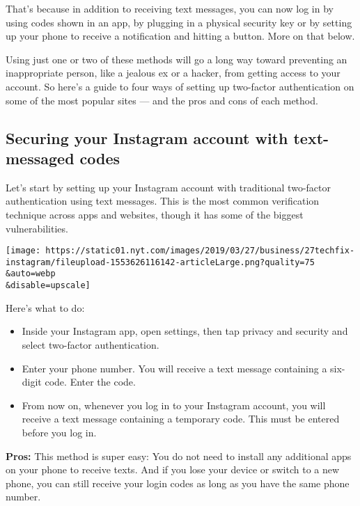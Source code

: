 That's because in addition to receiving text messages, you can now log
in by using codes shown in an app, by plugging in a physical security
key or by setting up your phone to receive a notification and hitting a
button. More on that below.

Using just one or two of these methods will go a long way toward
preventing an inappropriate person, like a jealous ex or a hacker, from
getting access to your account. So here's a guide to four ways of
setting up two-factor authentication on some of the most popular sites
--- and the pros and cons of each method.

\hypertarget{securing-your-instagram-account-with-text-messaged-codes}{%
\subsection{Securing your Instagram account with text-messaged
codes}\label{securing-your-instagram-account-with-text-messaged-codes}}

Let's start by setting up your Instagram account with traditional
two-factor authentication using text messages. This is the most common
verification technique across apps and websites, though it has some of
the biggest vulnerabilities.

\texttt{[image: https://static01.nyt.com/images/2019/03/27/business/27techfix-instagram/fileupload-1553626116142-articleLarge.png?quality=75\\\&auto=webp\\\&disable=upscale]}

Here's what to do:

\begin{itemize}
\tightlist
\item
  Inside your Instagram app, open settings, then tap privacy and
  security and select two-factor authentication.
\end{itemize}

\begin{itemize}
\item
  Enter your phone number. You will receive a text message containing a
  six-digit code. Enter the code.
\item
  From now on, whenever you log in to your Instagram account, you will
  receive a text message containing a temporary code. This must be
  entered before you log in.
\end{itemize}

\textbf{Pros:} This method is super easy: You do not need to install any
additional apps on your phone to receive texts. And if you lose your
device or switch to a new phone, you can still receive your login codes
as long as you have the same phone number.

